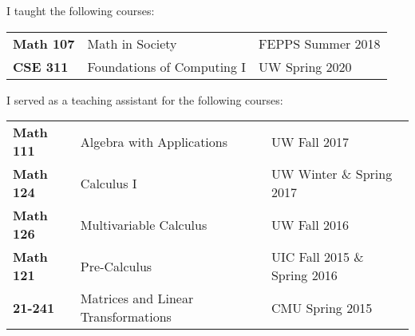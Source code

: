 \documentclass[12 pt]{article}
\newcommand{\lineunder}{\vspace*{-8pt} \\ \hspace*{-18pt} \hrulefill \\}
\newcommand{\header}[1]{{\hspace*{-15pt}\vspace*{6pt} \selectfont{\textsc{#1}}} \vspace*{-6pt} \lineunder}
\newcommand{\employer}[3]{{ \textbf{#1} \hfill #2 \\ #3\\  }}
\begin{document}
\bigskip











\header{Teaching}

I taught the following courses:
\begin{center}
	\begin{tabular}{ l l l }
	  \textbf{Math 107}& Math in Society & FEPPS Summer 2018 \\ 
	  \textbf{CSE 311}&	 Foundations of Computing I & UW Spring 2020 	
	\end{tabular}
\end{center}

I served as a teaching assistant for the following courses:
\begin{center}
	\begin{tabular}{ l l l }
	  \textbf{Math 111}& Algebra with Applications & UW Fall 2017 \\ 
	  \textbf{Math 124}&	 Calculus I & UW Winter  \& Spring 2017  \\  
	 \textbf{Math 126} &    Multivariable Calculus   & UW Fall 2016    \\
	\textbf{Math 121}	& Pre-Calculus	& UIC Fall 2015 \& Spring 2016\\	
	\textbf{21-241}	&	Matrices and Linear Transformations & CMU Spring 2015 	
	\end{tabular}
\end{center}

\end{document}
